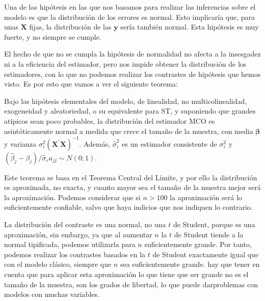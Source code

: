 

Una de las hip\'otesis en las que nos basamos para realizar las inferencias sobre el modelo es que la distribuci\'on de los errores es normal. Esto implicar\'ia que, para unas $\boldsymbol{X}$ fijas, la distribuci\'on de las $\boldsymbol{y}$ ser\'ia tambi\'en normal. Esta hip\'otesis es muy fuerte, y no siempre se cumple.

El hecho de que no se cumpla la hip\'otesis de normalidad no afecta a la insesgadez ni a la eficiencia del estimador, pero nos impide obtener la distribuci\'on de los estimadores, con lo que no podemos realizar los contrastes de hip\'otesis que hemos visto. Es por esto que vamos a ver el siguiente teorema:

\begin{teorema}
Bajo las hip\'otesis elementales del modelo, de linealidad, no multicolinealidad, exogeneidad y aleatoriedad, o su equivalente para ST, y suponiendo que grandes at\'ipicos sean poco probables, la distribuci\'on del estimador MCO es asint\'oticamente normal a medida que crece el tama\~no de la muestra, con media $\boldsymbol{\beta}$ y varianza $\sigma_{\varepsilon}^{2}\left(\boldsymbol{X}^{\prime}\boldsymbol{X}\right)^{-1}$.
Adem\'as, $\hat{\sigma}^2_\varepsilon$ es un estimador consistente de $\sigma^2_\varepsilon$ y $(\hat{\beta}_j-\beta_j)/\hat{\sigma}_{\varepsilon}a_{jj}\sim N(0;1)$.
\end{teorema}

Este teorema se basa en el Teorema Central del L\'imite, y por ello la distribuci\'on es aproximada, no exacta, y cuanto mayor sea el tama\~no de la muestra mejor ser\'a la aproximaci\'on. Podemos considerar que si $n>100$ la aproximaci\'on ser\'a lo suficientemente confiable, salvo que haya indicios que nos indiquen lo contrario.

La distribuci\'on del contraste es una normal, no una $t$ de Student, porque es una aproximaci\'on, sin embargo, ya que al aumentar $n$ la $t$ de Student tiende a la normal tipificada, podemos utilizarla para $n$ suficientemente grande. Por tanto, podemos realizar los contrastes basados en la $t$ de Student exactamente igual que con el modelo cl\'asico, siempre que $n$ sea suficientemente grande. hay que tener en cuenta que para aplicar esta aproximaci\'on lo que tiene que ser grande no es el tama\~no de la muestra, son los grados de libertad, lo que puede darproblemas con modelos con muchas variables.

